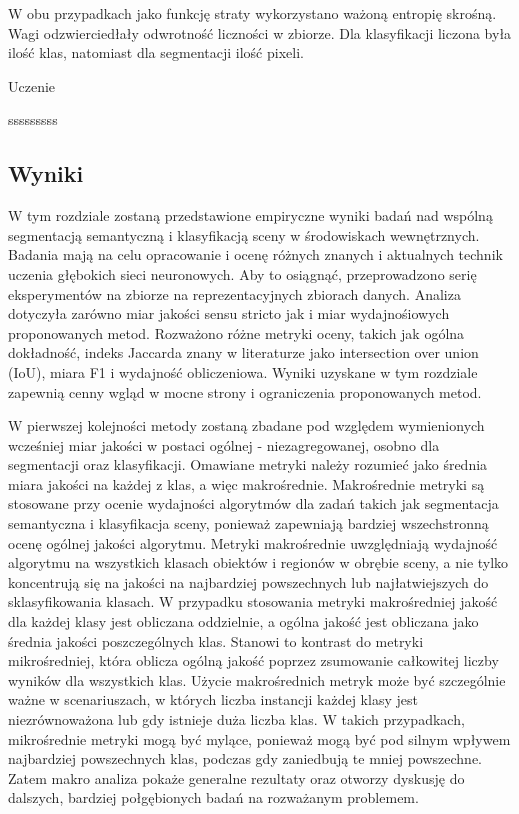 W obu przypadkach jako funkcję straty wykorzystano ważoną entropię skrośną. Wagi odzwierciedłały odwrotność liczności w zbiorze. Dla klasyfikacji liczona była ilość klas, natomiast dla segmentacji ilość pixeli.

\noindent
Uczenie

sssssssss

\subsection{Wyniki}
W tym rozdziale zostaną przedstawione empiryczne wyniki badań nad wspólną segmentacją semantyczną i klasyfikacją sceny w środowiskach wewnętrznych. Badania mają na celu opracowanie i ocenę różnych znanych i aktualnych technik uczenia głębokich sieci neuronowych. Aby to osiągnąć, przeprowadzono serię eksperymentów na zbiorze na reprezentacyjnych zbiorach danych. Analiza dotyczyła zarówno miar jakości sensu stricto jak i miar wydajnośiowych proponowanych metod. Rozważono różne metryki oceny, takich jak ogólna dokładność, indeks Jaccarda  znany w literaturze jako intersection over union (IoU), miara F1 i wydajność obliczeniowa. Wyniki uzyskane w tym rozdziale zapewnią cenny wgląd w mocne strony i ograniczenia proponowanych metod. 

W pierwszej kolejności metody zostaną zbadane pod względem wymienionych wcześniej miar jakości w postaci ogólnej - niezagregowanej, osobno dla segmentacji oraz klasyfikacji. Omawiane metryki należy rozumieć jako średnia miara jakości na każdej z klas, a więc makrośrednie. Makrośrednie metryki są stosowane przy ocenie wydajności algorytmów dla zadań takich jak segmentacja semantyczna i klasyfikacja sceny, ponieważ zapewniają bardziej wszechstronną ocenę ogólnej jakości algorytmu. Metryki makrośrednie uwzględniają wydajność algorytmu na wszystkich klasach obiektów i regionów w obrębie sceny, a nie tylko koncentrują się na jakości na najbardziej powszechnych lub najłatwiejszych do sklasyfikowania klasach. W przypadku stosowania metryki makrośredniej jakość dla każdej klasy jest obliczana oddzielnie, a ogólna jakość jest obliczana jako średnia jakości poszczególnych klas. Stanowi to kontrast do metryki mikrośredniej, która oblicza ogólną jakość poprzez zsumowanie całkowitej liczby wyników  dla wszystkich klas.
Użycie makrośrednich metryk może być szczególnie ważne w scenariuszach, w których liczba instancji każdej klasy jest niezrównoważona lub gdy istnieje duża liczba klas. W takich przypadkach, mikrośrednie metryki mogą być mylące, ponieważ mogą być pod silnym wpływem najbardziej powszechnych klas, podczas gdy zaniedbują te mniej powszechne. Zatem makro analiza pokaże generalne rezultaty oraz otworzy dyskusję do dalszych, bardziej połgębionych badań na rozważanym problemem.


